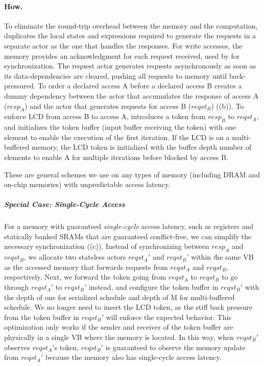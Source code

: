 \paragraph{How.} 

To eliminate the round-trip overhead between the memory and the computation, 
\name{} duplicates the local states and expressions required to generate the requests in a separate actor as the one that handles the responses.
For write accesses, the memory provides an acknowledgment for each request received, used by \name for synchronization.
The request actor generates requests asynchronously as soon as its data-dependencies are cleared, pushing all requests to memory until back-pressured.
To order a declared access A before a declared access B
\name creates a dummy dependency between the actor that accumulates the response of access A ($resp_A$) and the actor that generates requests for access B ($reqst_B$) ((b)).
To enforce LCD from access B to access A, \name introduces a token from $resp_B$ to $reqst_A$, and initializes the token buffer (input buffer receiving the token) with one element to enable the execution of the first iteration.
If the LCD is on a multi-buffered memory, the LCD token is initialized with the buffer depth number of elements to enable A for multiple iterations before blocked by access B.

These are general schemes we use on any types of memory (including DRAM and on-chip memories) with unpredictable access latency.

\subparagraph{Special Case: Single-Cycle Access}
For a memory with guaranteed {\em single-cycle} access latency, such as registers and statically banked SRAMs that are guaranteed conflict-free, we can simplify the necessary synchronization ((c)).
Instead of synchronizing between $resp_A$ and $reqst_B$, we allocate two stateless actors $reqst_A'$ and $reqst_B'$ within {\emph the same} VB as the accessed memory that forwards requests from $reqst_A$ and $reqst_B$, respectively.
Next, we forward the token going from $reqst_A$ to $reqst_B$ to go through $reqst_A'$ to $reqst_B'$ instead, and configure the token buffer in $reqst_B'$ with the depth of one for serialized schedule and depth of M for multi-buffered schedule. 
We no longer need to insert the LCD token, as the stiff back pressure from the token buffer in $reqst_B'$ will enforce the expected behavior.
This optimization only works if the sender and receiver of the token buffer are physically in a single VB where the memory is located.
In this way, when $reqst_B'$ observes $reqst_A'$s token, $reqst_B'$ is guaranteed to observe the memory update from $reqst_A'$ because the memory also has single-cycle access latency.


